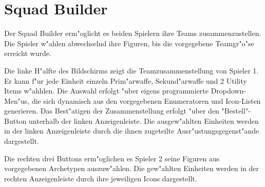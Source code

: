 \chapter{Squad Builder}

Der Squad Builder erm"oglicht es beiden Spielern ihre Teams zusammenzustellen. Die Spieler w"ahlen abwechselnd ihre Figuren, bis die vorgegebene Teamgr"o"se erreicht wurde. 

Die linke H"alfte des Bildschirms zeigt die Teamzusammenstellung von Spieler 1. Er kann f"ur jede Einheit einzeln Prim"arwaffe, Sekund"arwaffe und 2 Utility Items w"ahhlen. Die Auswahl erfolgt "uber eigens programmierte Dropdown-Men"us, die sich dynamisch aus den vorgegebenen Enumeratoren und Icon-Listen generieren. Das Best"atigen der Zusammenstellung erfolgt "uber den "Bestell"-Button unterhalb der linken Anzeigenleiste.   
Die ausgew"ahlten Einheiten werden in der linken Anzeigenleiste durch die ihnen zugeteilte Ausr"ustungsgegenst"ande dargestellt.  

Die rechten drei Buttons erm"oglichen es Spieler 2 seine Figuren aus vorgegebenen Archetypen auszuw"ahlen. Die gew"ahlten Einheiten werden in der rechten Anzeigenleiste durch ihre jeweiligen Icons dargestellt. 

